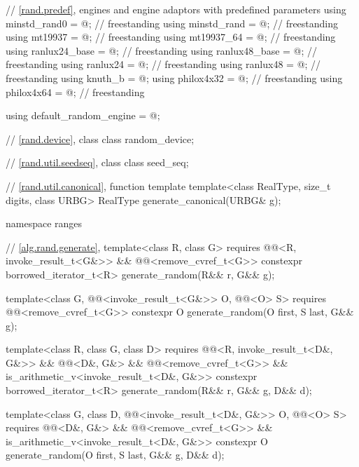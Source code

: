 \begin{codeblock}
{  // \ref{rand.predef}, engines and engine adaptors with predefined parameters
  using minstd_rand0  = @\seebelow@;      // freestanding
  using minstd_rand   = @\seebelow@;      // freestanding
  using mt19937       = @\seebelow@;      // freestanding
  using mt19937_64    = @\seebelow@;      // freestanding
  using ranlux24_base = @\seebelow@;      // freestanding
  using ranlux48_base = @\seebelow@;      // freestanding
  using ranlux24      = @\seebelow@;      // freestanding
  using ranlux48      = @\seebelow@;      // freestanding
  using knuth_b       = @\seebelow@;
  using philox4x32    = @\seebelow@;      // freestanding
  using philox4x64    = @\seebelow@;      // freestanding

  using default_random_engine = @\seebelow@;

  // \ref{rand.device}, class 
  class random_device;

  // \ref{rand.util.seedseq}, class 
  class seed_seq;

  // \ref{rand.util.canonical}, function template 
  template<class RealType, size_t digits, class URBG>
    RealType generate_canonical(URBG& g);

  namespace ranges {
    // \ref{alg.rand.generate}, 
    template<class R, class G>
      requires @@<R, invoke_result_t<G&>> &&
               @@<remove_cvref_t<G>>
      constexpr borrowed_iterator_t<R> generate_random(R&& r, G&& g);

    template<class G, @@<invoke_result_t<G&>> O, @@<O> S>
      requires @@<remove_cvref_t<G>>
      constexpr O generate_random(O first, S last, G&& g);

    template<class R, class G, class D>
      requires @@<R, invoke_result_t<D&, G&>> && @@<D&, G&> &&
               @@<remove_cvref_t<G>> &&
               is_arithmetic_v<invoke_result_t<D&, G&>>
      constexpr borrowed_iterator_t<R> generate_random(R&& r, G&& g, D&& d);

    template<class G, class D, @@<invoke_result_t<D&, G&>> O, @@<O> S>
      requires @@<D&, G&> && @@<remove_cvref_t<G>> &&
               is_arithmetic_v<invoke_result_t<D&, G&>>
      constexpr O generate_random(O first, S last, G&& g, D&& d);
  }

}
\end{codeblock}
